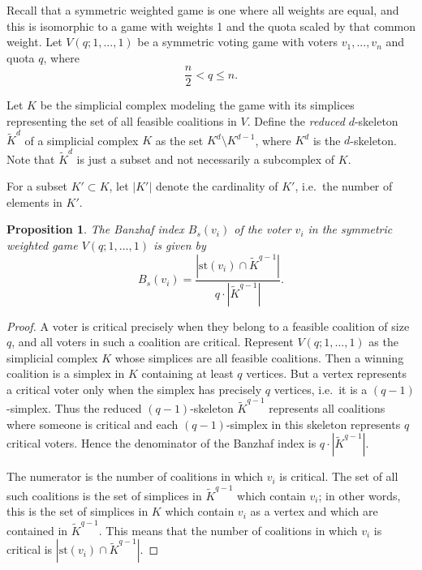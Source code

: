 \documentclass[11pt]{amsart}
\newcommand{\ifn}[1]{\footnote{{\bf Ismar: }#1}} %
\theoremstyle{plain}
\newtheorem{prop}[thm]{Proposition}
\theoremstyle{definition}
\theoremstyle{remark}
\begin{document}
Recall that a symmetric weighted game is one where all weights are equal, and this is isomorphic to a game with weights 1 and the quota scaled by that common weight. Let $V(q;1,...,1)$ be a symmetric voting game with voters $v_1,...,v_n$ and quota $q$, where $$\frac{n}{2} < q\leq n.$$ 

Let $K$ be the simplicial complex modeling the game with its simplices representing the set of all feasible coalitions in $V$. 
Define the \textit{reduced} $d$-skeleton $\widetilde{K}^d$ of a simplicial complex $K$ as the set $K^d\setminus K^{d-1}$, where $K^d$ is the $d$-skeleton. Note that $\widetilde{K}^d$ is just a subset and not necessarily a subcomplex of $K$.

For a subset $K' \subset K$, let $|K'|$ denote the cardinality of $K'$, i.e.~the number of elements in $K'$.



\begin{prop}
The Banzhaf index $B_s (v_i)$ of the voter $v_i$ in the symmetric weighted game $V(q;1,...,1)$ is given by
$$B_s (v_i)=\frac{|\text{st}(v_i)\cap \widetilde{K}^{q-1}|}{q \cdot |\widetilde{K}^{q-1}|}.$$
\end{prop}
\begin{proof}
A voter is critical precisely when they belong to a feasible coalition of size $q$, and all voters in such a coalition are critical. Represent $V(q;1,...,1)$ as the simplicial complex $K$ whose simplices are all feasible coalitions. Then a winning coalition is a simplex in $K$ containing at least $q$ vertices. But a vertex represents a critical voter only when the simplex has precisely $q$ vertices, i.e.~it is a $(q-1)$-simplex. Thus the reduced $(q-1)$-skeleton $\widetilde{K}^{q-1}$ represents all coalitions where someone is critical and each $(q-1)$-simplex in this skeleton represents $q$ critical voters. Hence the denominator of the Banzhaf index is $q \cdot |\widetilde{K}^{q-1}|.$

The numerator is the number of coalitions in which $v_i$ is critical. The set of all such coalitions is the set of simplices in $\widetilde{K}^{q-1}$ which contain $v_i$; in other words, this is the set of simplices in $K$ which contain $v_i$ as a vertex and which are contained in $\widetilde{K}^{q-1}$. This means that the number of coalitions in which $v_i$ is critical is
$|\text{st}(v_i)\cap \widetilde{K}^{q-1}|.$
\end{proof}
\end{document}

